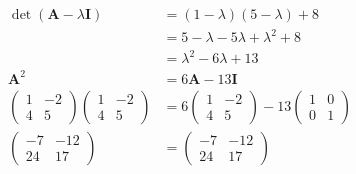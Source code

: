 \documentclass{article}
\begin{document}
\subsubsection{}

\begin{align*}
  \det (\mathbf{A} - \lambda \mathbf{I}) & = (1 - \lambda) (5 - \lambda) + 8         \\
                                         & = 5 - \lambda - 5 \lambda + \lambda^2 + 8 \\
                                         & = \lambda^2 - 6 \lambda + 13              \\
  \mathbf{A}^2                           & = 6 \mathbf{A} - 13 \mathbf{I}            \\
  \begin{pmatrix}
    1 & -2 \\
    4 & 5
  \end{pmatrix} \begin{pmatrix}
                  1 & -2 \\
                  4 & 5
                \end{pmatrix}          & = 6 \begin{pmatrix}
                                               1 & -2 \\
                                               4 & 5
                                             \end{pmatrix} - 13 \begin{pmatrix}
                                                                  1 & 0 \\
                                                                  0 & 1
                                                                \end{pmatrix}       \\
  \begin{pmatrix}
    -7 & -12 \\
    24 & 17
  \end{pmatrix}                        & = \begin{pmatrix}
                                             -7 & -12 \\
                                             24 & 17
                                           \end{pmatrix}
\end{align*}

\setcounter{subsubsection}{2}
\subsubsection{}
\end{document}

